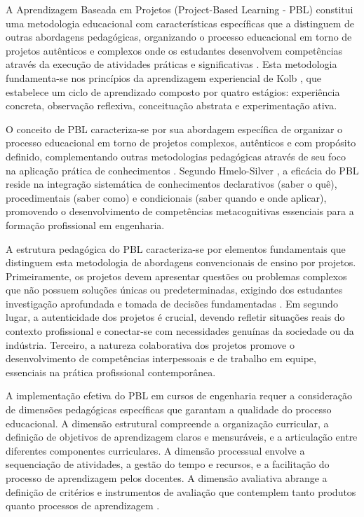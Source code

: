 \documentclass[12pt,a4paper]{article}
\begin{document}
A Aprendizagem Baseada em Projetos (Project-Based Learning - PBL) constitui uma metodologia educacional com características específicas que a distinguem de outras abordagens pedagógicas, organizando o processo educacional em torno de projetos autênticos e complexos onde os estudantes desenvolvem competências através da execução de atividades práticas e significativas \cite{thomas2000, savery2015}. Esta metodologia fundamenta-se nos princípios da aprendizagem experiencial de Kolb \cite{kolb1984}, que estabelece um ciclo de aprendizado composto por quatro estágios: experiência concreta, observação reflexiva, conceituação abstrata e experimentação ativa.

O conceito de PBL caracteriza-se por sua abordagem específica de organizar o processo educacional em torno de projetos complexos, autênticos e com propósito definido, complementando outras metodologias pedagógicas através de seu foco na aplicação prática de conhecimentos \cite{duch2001}. Segundo Hmelo-Silver \cite{hmelo2004}, a eficácia do PBL reside na integração sistemática de conhecimentos declarativos (saber o quê), procedimentais (saber como) e condicionais (saber quando e onde aplicar), promovendo o desenvolvimento de competências metacognitivas essenciais para a formação profissional em engenharia.

A estrutura pedagógica do PBL caracteriza-se por elementos fundamentais que distinguem esta metodologia de abordagens convencionais de ensino por projetos. Primeiramente, os projetos devem apresentar questões ou problemas complexos que não possuem soluções únicas ou predeterminadas, exigindo dos estudantes investigação aprofundada e tomada de decisões fundamentadas \cite{savery2015}. Em segundo lugar, a autenticidade dos projetos é crucial, devendo refletir situações reais do contexto profissional e conectar-se com necessidades genuínas da sociedade ou da indústria. Terceiro, a natureza colaborativa dos projetos promove o desenvolvimento de competências interpessoais e de trabalho em equipe, essenciais na prática profissional contemporânea.

A implementação efetiva do PBL em cursos de engenharia requer a consideração de dimensões pedagógicas específicas que garantam a qualidade do processo educacional. A dimensão estrutural compreende a organização curricular, a definição de objetivos de aprendizagem claros e mensuráveis, e a articulação entre diferentes componentes curriculares. A dimensão processual envolve a sequenciação de atividades, a gestão do tempo e recursos, e a facilitação do processo de aprendizagem pelos docentes. A dimensão avaliativa abrange a definição de critérios e instrumentos de avaliação que contemplem tanto produtos quanto processos de aprendizagem \cite{thomas2000}.
\end{document}
